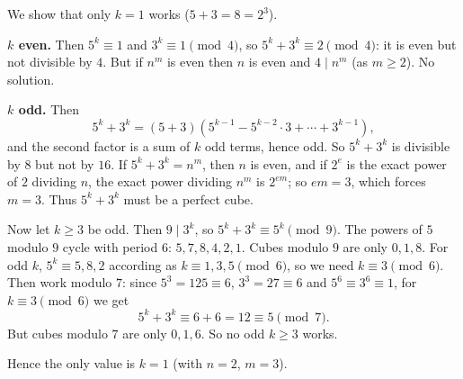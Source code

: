 We show that only $k=1$ works ($5+3=8=2^3$).

\textbf{$k$ even.} Then $5^k\equiv1$ and $3^k\equiv1\pmod4$, so $5^k+3^k\equiv2\pmod4$: it is even but not divisible by $4$. But if $n^m$ is even then $n$ is even and $4\mid n^m$ (as $m\ge2$). No solution.

\textbf{$k$ odd.} Then
\[
5^k+3^k=(5+3)\left(5^{k-1}-5^{k-2}\cdot3+\cdots+3^{k-1}\right),
\]
and the second factor is a sum of $k$ odd terms, hence odd. So $5^k+3^k$ is divisible by $8$ but not by $16$. If $5^k+3^k=n^m$, then $n$ is even, and if $2^e$ is the exact power of $2$ dividing $n$, the exact power dividing $n^m$ is $2^{em}$; so $em=3$, which forces $m=3$. Thus $5^k+3^k$ must be a perfect cube.

Now let $k\ge3$ be odd. Then $9\mid3^k$, so $5^k+3^k\equiv5^k\pmod9$. The powers of $5$ modulo $9$ cycle with period $6$: $5,7,8,4,2,1$. Cubes modulo $9$ are only $0,1,8$. For odd $k$, $5^k\equiv5,8,2$ according as $k\equiv1,3,5\pmod6$, so we need $k\equiv3\pmod6$. Then work modulo $7$: since $5^3=125\equiv6$, $3^3=27\equiv6$ and $5^6\equiv3^6\equiv1$, for $k\equiv3\pmod6$ we get
\[
5^k+3^k\equiv6+6=12\equiv5\pmod7 .
\]
But cubes modulo $7$ are only $0,1,6$. So no odd $k\ge3$ works.

Hence the only value is $\boxed{k=1}$ (with $n=2$, $m=3$).
